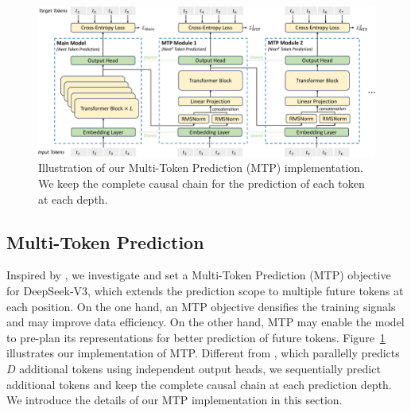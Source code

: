 \documentclass[11pt, a4paper, logo, copyright, nonumbering]{deepseek}
\newcommand{\dsviii}{DeepSeek-V3}
\begin{document}
\begin{CJK*}{UTF8}{gbsn}
\begin{figure}[!t]
\centering
\includegraphics[width=0.99\linewidth]{figures/nextn.pdf}
\caption{
    Illustration of our Multi-Token Prediction (MTP) implementation. 
    We keep the complete causal chain for the prediction of each token at each depth. 
}
\label{fig:nextn}
\end{figure}

\subsection{Multi-Token Prediction}

Inspired by \citet{meta_mtp}, we investigate and set a Multi-Token Prediction (MTP) objective for \dsviii{}, which extends the prediction scope to multiple future tokens at each position.
On the one hand, an MTP objective densifies the training signals and may improve data efficiency.
On the other hand, MTP may enable the model to pre-plan its representations for better prediction of future tokens.
Figure~\ref{fig:nextn} illustrates our implementation of MTP.
Different from \citet{meta_mtp}, which parallelly predicts $D$ additional tokens using independent output heads, we sequentially predict additional tokens and keep the complete causal chain at each prediction depth.
We introduce the details of our MTP implementation in this section.


\end{CJK*}
\end{document}
